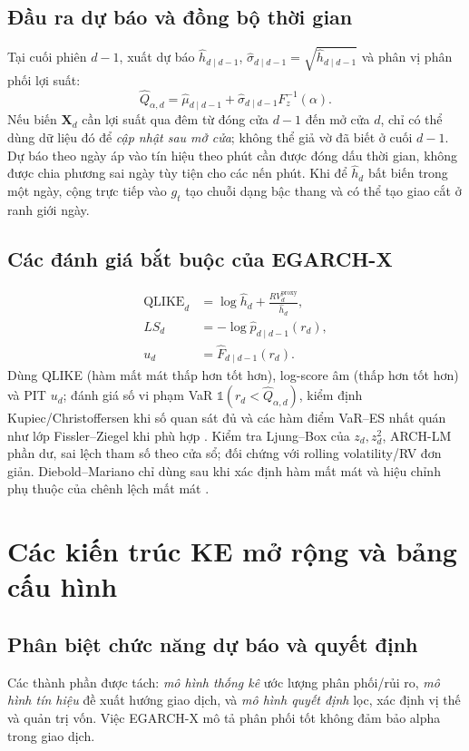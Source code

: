 \documentclass[12pt,a4paper,oneside]{article}
\newcommand{\Ind}{\mathbb{1}}
\begin{document}
\subsection{Đầu ra dự báo và đồng bộ thời gian}
Tại cuối phiên $d-1$, xuất dự báo $\widehat h_{d\mid d-1}$, $\widehat\sigma_{d\mid d-1}=\sqrt{\widehat h_{d\mid d-1}}$ và phân vị phân phối lợi suất:
\begin{equation}
\widehat Q_{\alpha,d}=\widehat\mu_{d\mid d-1}+
\widehat\sigma_{d\mid d-1}F_z^{-1}(\alpha).
\end{equation}
Nếu biến $\bm X_d$ cần lợi suất qua đêm từ đóng cửa $d-1$ đến mở cửa $d$, chỉ có thể dùng dữ liệu đó để \emph{cập nhật sau mở cửa}; không thể giả vờ đã biết ở cuối $d-1$. Dự báo theo ngày áp vào tín hiệu theo phút cần được đóng dấu thời gian, không được chia phương sai ngày tùy tiện cho các nến phút. Khi để $\widehat h_d$ bất biến trong một ngày, cộng trực tiếp vào $g_t$ tạo chuỗi dạng bậc thang và có thể tạo giao cắt ở ranh giới ngày.

\subsection{Các đánh giá bắt buộc của EGARCH-X}
\begin{align}
\operatorname{QLIKE}_d&=\log\widehat h_d+\frac{RV_d^{\mathrm{proxy}}}{\widehat h_d},\\
LS_d&=-\log \widehat p_{d\mid d-1}(r_d),\\
u_d&=\widehat F_{d\mid d-1}(r_d).
\end{align}
Dùng QLIKE (hàm mất mát thấp hơn tốt hơn), log-score âm (thấp hơn tốt hơn) và PIT $u_d$; đánh giá số vi phạm VaR $\Ind(r_d<\widehat Q_{\alpha,d})$, kiểm định Kupiec/Christoffersen khi số quan sát đủ và các hàm điểm VaR--ES nhất quán như lớp Fissler--Ziegel khi phù hợp \cite{fissler2016}. Kiểm tra Ljung--Box của $z_d,z_d^2$, ARCH-LM phần dư, sai lệch tham số theo cửa sổ; đối chứng với rolling volatility/RV đơn giản. Diebold--Mariano chỉ dùng sau khi xác định hàm mất mát và hiệu chỉnh phụ thuộc của chênh lệch mất mát \cite{dm1995}.

\section{Các kiến trúc KE mở rộng và bảng cấu hình}
\subsection{Phân biệt chức năng dự báo và quyết định}
Các thành phần được tách: \emph{mô hình thống kê} ước lượng phân phối/rủi ro, \emph{mô hình tín hiệu} đề xuất hướng giao dịch, và \emph{mô hình quyết định} lọc, xác định vị thế và quản trị vốn. Việc EGARCH-X mô tả phân phối tốt không đảm bảo alpha trong giao dịch.
\end{document}
